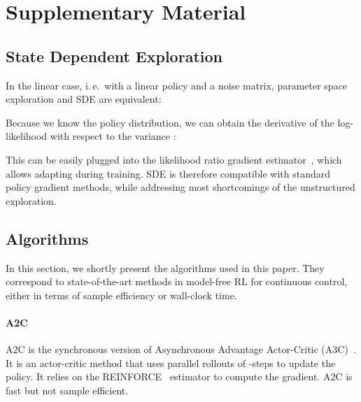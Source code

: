 \documentclass{article}
\newcommand{\ie}{i.\,e.\ }
\newcommand{\SDE}{\textsc{SDE}\xspace}
\newcommand{\aac}{\textsc{A2C}\xspace}
\begin{document}
  

\clearpage











\appendix

\section{Supplementary Material}

\subsection{State Dependent Exploration}
\label{sec:sde-eq}


In the linear case, \ie with a linear policy and a noise matrix, parameter space exploration and \SDE are equivalent:



Because we know the policy distribution, we can obtain the derivative of the log-likelihood  with respect to the variance :




This can be easily plugged into the likelihood ratio gradient estimator~\citep{williams1992simple}, which allows adapting  during training.
\SDE is therefore compatible with standard policy gradient methods, while addressing most shortcomings of the unstructured exploration.


\subsection{Algorithms}
\label{sec:algorithms}

In this section, we shortly present the algorithms used in this paper. They correspond to state-of-the-art methods in model-free RL for continuous control, either in terms of sample efficiency or wall-clock time.

\paragraph{\aac}
\aac is the synchronous version of Asynchronous Advantage Actor-Critic (A3C)~\citep{mnih2016asynchronous}.
It is an actor-critic method that uses parallel rollouts of -steps to update the policy. It relies on the \textsc{REINFORCE}~\citep{williams1992simple} estimator to compute the gradient. \aac is fast but not sample efficient.
\end{document}
